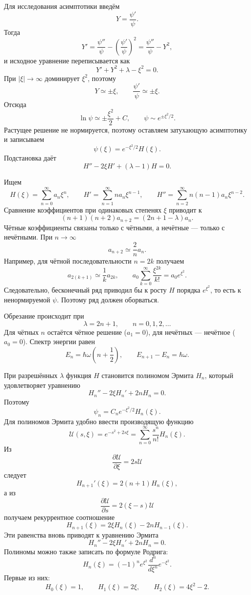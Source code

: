 \documentclass[12pt,a4paper]{article}
\begin{document}
Для исследования асимптотики введём
\[
    Y=\frac{\psi'}{\psi}.
\]
Тогда
\[
    Y'=\frac{\psi''}{\psi}
    -\left(\frac{\psi'}{\psi}\right)^2
    =\frac{\psi''}{\psi}-Y^2,
\]
и исходное уравнение переписывается как
\[
    Y'+Y^2+\lambda-\xi^2=0.
\]
При $|\xi|\to\infty$ доминирует $\xi^2$, поэтому
\[
    Y\simeq\pm\xi,
    \qquad
    \frac{\psi'}{\psi}\simeq\pm\xi.
\]
Отсюда
\[
    \ln\psi\simeq\pm\frac{\xi^2}{2}+C,
    \qquad
    \psi\sim e^{\pm\xi^2/2}.
\]
Растущее решение не нормируется, поэтому оставляем затухающую асимптотику
и записываем
\[
    \psi(\xi)=e^{-\xi^2/2}H(\xi).
\]
Подстановка даёт
\[
    \boxed{H''-2\xi H'+(\lambda-1)H=0}.
\]

Ищем
\[
    H(\xi)=\sum_{n=0}^{\infty}a_n\xi^n,
    \qquad
    H'=\sum_{n=1}^{\infty}na_n\xi^{n-1},
    \qquad
    H''=\sum_{n=2}^{\infty}n(n-1)a_n\xi^{n-2}.
\]
Сравнение коэффициентов при одинаковых степенях $\xi$ приводит к
\[
    \boxed{(n+1)(n+2)a_{n+2}=(2n+1-\lambda)a_n}.
\]
Чётные коэффициенты связаны только с чётными, а нечётные --- только с
нечётными. При $n\to\infty$
\[
    a_{n+2}\simeq\frac{2}{n}a_n.
\]
Например, для чётной последовательности $n=2k$ получаем
\[
    a_{2(k+1)}\simeq\frac{1}{k}a_{2k},
    \qquad
    a_0\sum_{k=0}^{\infty}\frac{\xi^{2k}}{k!}
    =a_0e^{\xi^2}.
\]
Следовательно, бесконечный ряд приводил бы к росту $H$ порядка
$e^{\xi^2}$, то есть к ненормируемой $\psi$. Поэтому ряд должен
оборваться.

Обрезание происходит при
\[
    \boxed{\lambda=2n+1},
    \qquad n=0,1,2,\ldots
\]
Для чётных $n$ остаётся чётное решение ($a_1=0$), для нечётных --- нечётное
($a_0=0$). Спектр энергии равен
\[
    \boxed{E_n=\hbar\omega\left(n+\frac12\right)},
    \qquad
    E_{n+1}-E_n=\hbar\omega.
\]

При разрешённых $\lambda$ функция $H$ становится полиномом Эрмита $H_n$,
который удовлетворяет уравнению
\[
    \boxed{H_n''-2\xi H_n'+2nH_n=0}.
\]
Поэтому
\[
    \psi_n=C_ne^{-\xi^2/2}H_n(\xi).
\]
Для полиномов Эрмита удобно ввести производящую функцию
\[
    \boxed{\mathcal U(s,\xi)=e^{-s^2+2s\xi}
    =\sum_{n=0}^{\infty}\frac{s^n}{n!}H_n(\xi)}.
\]
Из
\[
    \frac{\partial\mathcal U}{\partial\xi}=2s\mathcal U
\]
следует
\[
    H_{n+1}'(\xi)=2(n+1)H_n(\xi),
\]
а из
\[
    \frac{\partial\mathcal U}{\partial s}=2(\xi-s)\mathcal U
\]
получаем рекуррентное соотношение
\[
    H_{n+1}(\xi)=2\xi H_n(\xi)-2nH_{n-1}(\xi).
\]
Эти равенства вновь приводят к уравнению Эрмита
\[
    H_n''-2\xi H_n'+2nH_n=0.
\]
Полиномы можно также записать по формуле Родрига:
\[
    \boxed{H_n(\xi)=(-1)^ne^{\xi^2}
    \frac{d^n}{d\xi^n}e^{-\xi^2}}.
\]
Первые из них:
\[
    H_0(\xi)=1,
    \qquad
    H_1(\xi)=2\xi,
    \qquad
    H_2(\xi)=4\xi^2-2.
\]
\end{document}
